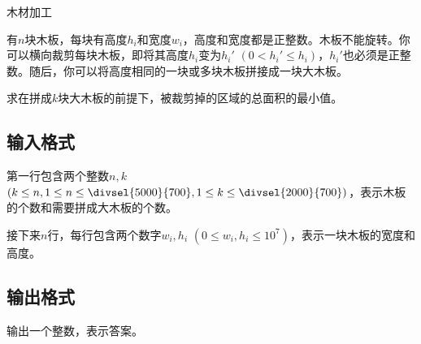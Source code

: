 \begin{Problem}{木材加工}{}

有$n$块木板，每块有高度$h_i$和宽度$w_i$，高度和宽度都是正整数。木板不能旋转。你可以横向裁剪每块木板，即将其高度$h_i$变为$h_i'$ $(0 < h_i' \leq h_i)$，$h_i'$也必须是正整数。随后，你可以将高度相同的一块或多块木板拼接成一块大木板。

求在拼成$k$块大木板的前提下，被裁剪掉的区域的总面积的最小值。

\subsection*{输入格式}

第一行包含两个整数$n, k$ $(k \leq n, 1 \leq n \leq \divsel{5000}{700}, 1 \leq k \leq \divsel{2000}{700})$，表示木板的个数和需要拼成大木板的个数。

接下来$n$行，每行包含两个数字$w_i, h_i$ $(0 \leq w_i, h_i \leq 10^7)$，表示一块木板的宽度和高度。

\subsection*{输出格式}

输出一个整数，表示答案。


\end{Problem}

